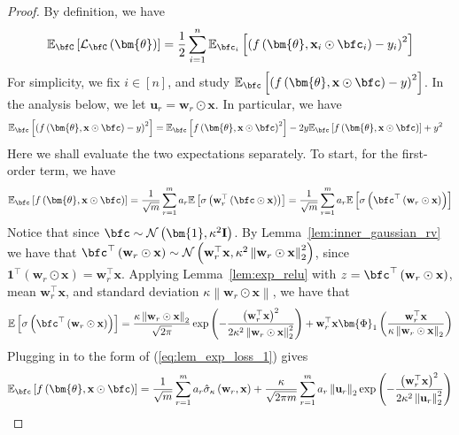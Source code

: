 \documentclass[10pt]{article} %
\theoremstyle{definition}
\theoremstyle{plain}
\newcommand{\paren}[1]{\left(#1\right)}
\newcommand{\norm}[1]{\left\|#1\right\|}
\newcommand{\act}[2]{\hat{\sigma}_{\kappa}\paren{#1,#2}}
\providecommand{\E}{\mathbb{E}}
\def\calL{{\mathcal{L}}}
\def\bfI{{\mathbf{I}}}\def\bfJ{{\mathbf{J}}}\def\bfK{{\mathbf{K}}}\def\bfL{{\mathbf{L}}}
\def\bfu{{\mathbf{u}}}\def\bfv{{\mathbf{v}}}\def\bfw{{\mathbf{w}}}\def\bfx{{\mathbf{x}}}
\begin{document}
\begin{proof}
    By definition, we have
    \[
        \E_{\bfC}\left[\calL_{\bfC}\paren{\bm{\theta}}\right] = \frac{1}{2}\sum_{i=1}^n\E_{\bfc_i}\left[\paren{f\paren{\bm{\theta},\bfx_i\odot\bfc_i} - y_i}^2\right]
    \]
    For simplicity, we fix $i\in[n]$, and study $\E_{\bfc}\left[\paren{f\paren{\bm{\theta},\bfx\odot\bfc} - y}^2\right]$. In the analysis below, we let $\bfu_r = \bfw_r\odot\bfx$. In particular, we have
    \begin{align*}
        \E_{\bfc}\left[\paren{f\paren{\bm{\theta},\bfx\odot\bfc} - y}^2\right] & = \E_{\bfc}\left[f\paren{\bm{\theta},\bfx\odot\bfc}^2\right] - 2y\E_{\bfc}\left[f\paren{\bm{\theta},\bfx\odot\bfc}\right] + y^2
    \end{align*}
    Here we shall evaluate the two expectations separately. To start, for the first-order term, we have
    \begin{equation}
        \label{eq:lem_exp_loss_1}
        \E_{\bfc}\left[f\paren{\bm{\theta},\bfx\odot\bfc}\right] = \frac{1}{\sqrt{m}}\sum_{r=1}^ma_r\E\left[\sigma\paren{\bfw_r^\top\paren{\bfc\odot\bfx}}\right] = \frac{1}{\sqrt{m}}\sum_{r=1}^ma_r\E\left[\sigma\paren{\bfc^\top\paren{\bfw_r\odot\bfx}}\right]
    \end{equation}
    Notice that since $\bfc\sim\mathcal{N}\paren{\bm{1}, \kappa^2\bfI}$. By Lemma~\ref{lem:inner_gaussian_rv} we have that $\bfc^\top\paren{\bfw_r\odot\bfx}\sim\mathcal{N}\paren{\bfw_r^\top\bfx,\kappa^2\norm{\bfw_r\odot\bfx}_2^2}$, since $\bm{1}^\top\paren{\bfw_r\odot\bfx} = \bfw_r^\top\bfx$. Applying Lemma~\ref{lem:exp_relu} with $z=\bfc^\top\paren{\bfw_r\odot\bfx}$, mean $\bfw_r^\top\bfx$, and standard deviation $\kappa\norm{\bfw_r\odot\bfx}$, we have that
    \begin{equation}
        \label{eq:expect_act}
        \E\left[\sigma\paren{\bfc^\top\paren{\bfw_r\odot\bfx}}\right] = \frac{\kappa\norm{\bfw_r\odot\bfx}_2}{\sqrt{2
        \pi}}\exp\paren{-\frac{\paren{\bfw_r^\top\bfx}^2}{2\kappa^2\norm{\bfw_r\odot\bfx}_2^2}} + \bfw_r^\top\bfx\bm{\Phi}_1\paren{\frac{\bfw_r^\top\bfx}{\kappa\norm{\bfw_r\odot\bfx}_2}}
    \end{equation}
    Plugging in to the form of (\ref{eq:lem_exp_loss_1}) gives
    \begin{equation}
        \E_{\bfc}\left[f\paren{\bm{\theta},\bfx\odot\bfc}\right] = \frac{1}{\sqrt{m}}\sum_{r=1}^ma_r\act{\bfw_r}{\bfx} + \frac{\kappa}{\sqrt{2\pi m}}\sum_{r=1}^ma_r\norm{\bfu_r}_2\exp\paren{-\frac{\paren{\bfw_r^\top\bfx}^2}{2\kappa^2\norm{\bfu_r}_2^2}}

\end{equation}
\end{proof}
\end{document}
